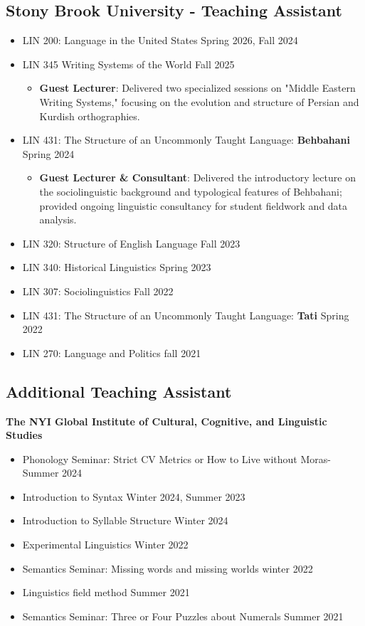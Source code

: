 \documentclass[a4paper,10pt]{article}
\begin{document}
\subsection*{Stony Brook University - Teaching Assistant}
\begin{itemize}
    \item LIN 200: Language in the United States \hfill Spring 2026, Fall 2024
    \item LIN 345 Writing Systems of the World \hfill Fall 2025
    \begin{itemize}[label={$\circ$}]
        \item \textbf{Guest Lecturer}: Delivered two specialized sessions on "Middle Eastern Writing Systems," focusing on the evolution and structure of Persian and Kurdish orthographies.
    \end{itemize}
    \item LIN 431: The Structure of an Uncommonly Taught Language: \textbf{Behbahani} \hfill Spring 2024
    \begin{itemize}[label={$\circ$}]
        \item \textbf{Guest Lecturer \& Consultant}: Delivered the introductory lecture on the sociolinguistic background and typological features of Behbahani; provided ongoing linguistic consultancy for student fieldwork and data analysis.
    \end{itemize}
    \item LIN 320: Structure of English Language \hfill Fall 2023
    \item LIN 340: Historical Linguistics \hfill Spring 2023
    \item LIN 307: Sociolinguistics \hfill Fall 2022
    \item LIN 431: The Structure of an Uncommonly Taught Language: \textbf{Tati}  \hfill Spring 2022
    \item LIN 270: Language and Politics \hfill fall 2021
\end{itemize}

\subsection*{Additional Teaching Assistant}
\textbf{The NYI Global Institute of Cultural, Cognitive, and Linguistic Studies}
\begin{itemize}
    \item  Phonology Seminar: Strict CV Metrics or How to Live without Moras- \hfill Summer 2024
    \item Introduction to Syntax \hfill Winter 2024, Summer 2023 
    \item Introduction to Syllable Structure \hfill Winter 2024
    \item Experimental Linguistics \hfill Winter 2022
    \item Semantics Seminar: Missing words and missing worlds \hfill winter 2022
    \item Linguistics field method \hfill Summer 2021
    \item Semantics Seminar: Three or Four Puzzles about Numerals \hfill Summer 2021
\end{itemize}
\end{document}
